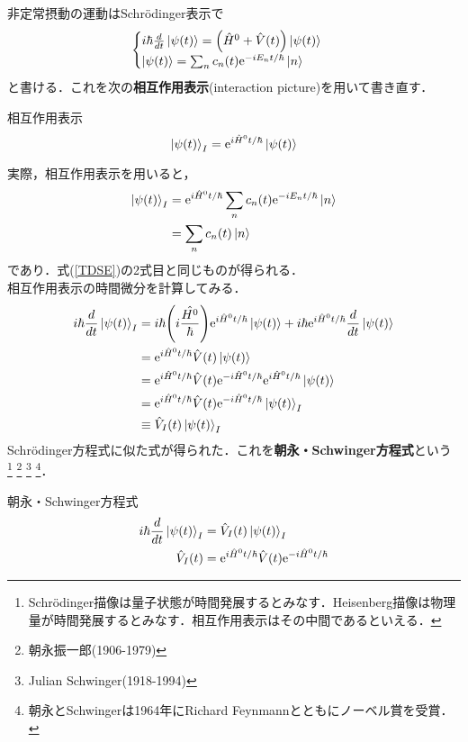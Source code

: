 \documentclass{standalone}
\begin{document}
  非定常摂動の運動はSchrödinger表示で
  \begin{equation}
    \label{TDSE}
    \begin{cases}
    i\hbar\frac{d}{dt}\ket{\psi(t)}=\qty(\hat{H}^0+\hat{V}(t))\ket{\psi(t)}\\
    \ket{\psi(t)}=\sum_{n}c_n(t)\mathrm{e}^{-iE_nt/\hbar}\ket{n}
    \end{cases}
  \end{equation}
  と書ける．これを次の\textbf{相互作用表示}(interaction picture)を用いて書き直す．
  \begin{itembox}[l]{相互作用表示}
    \begin{equation}
      \ket{\psi(t)}_I=\mathrm{e}^{i\hat{H}^0t/\hbar}\ket{\psi(t)}
    \end{equation}  
  \end{itembox}
  実際，相互作用表示を用いると，
  \begin{align}
    \ket{\psi(t)}_I&=\mathrm{e}^{i\hat{H}^0t/\hbar}\sum_{n}c_n(t)\mathrm{e}^{-iE_nt/\hbar}\ket{n}\\
    &=\sum_{n}c_n(t)\ket{n}
  \end{align}
  であり．式(\ref{TDSE})の2式目と同じものが得られる．\\
  相互作用表示の時間微分を計算してみる．
  \begin{align}
    i\hbar\frac{d}{dt}\ket{\psi(t)}_I&=i\hbar\qty(i\frac{\hat{H^0}}{\hbar})\mathrm{e}^{i\hat{H}^0t/\hbar}\ket{\psi(t)}+i\hbar\mathrm{e}^{i\hat{H}^0t/\hbar}\frac{d}{dt}\ket{\psi(t)}\\
    &=\mathrm{e}^{i\hat{H}^0t/\hbar}\hat{V}(t)\ket{\psi(t)}\\
    &=\mathrm{e}^{i\hat{H}^0t/\hbar}\hat{V}(t)\mathrm{e}^{-i\hat{H}^0t/\hbar}\mathrm{e}^{i\hat{H}^0t/\hbar}\ket{\psi(t)}\\
    &=\mathrm{e}^{i\hat{H}^0t/\hbar}\hat{V}(t)\mathrm{e}^{-i\hat{H}^0t/\hbar}\ket{\psi(t)}_I\\
    &\equiv\hat{V}_I(t)\ket{\psi(t)}_I
  \end{align}
  Schrödinger方程式に似た式が得られた．これを\textbf{朝永・Schwinger方程式}という
  \footnote{Schrödinger描像は量子状態が時間発展するとみなす．Heisenberg描像は物理量が時間発展するとみなす．相互作用表示はその中間であるといえる．}  
  \footnote{朝永振一郎(1906-1979)}
  \footnote{Julian Schwinger(1918-1994)}
  \footnote{朝永とSchwingerは1964年にRichard Feynmannとともにノーベル賞を受賞．}．
  \begin{itembox}[l]{朝永・Schwinger方程式}
    \begin{align}
      \label{Tomonaga}
      i\hbar\frac{d}{dt}\ket{\psi(t)}_I&=\hat{V}_I(t)\ket{\psi(t)}_I\\
      \hat{V}_I(t)&=\mathrm{e}^{i\hat{H}^0t/\hbar}\hat{V}(t)\mathrm{e}^{-i\hat{H}^0t/\hbar}
    \end{align}
  \end{itembox}
\end{document}
